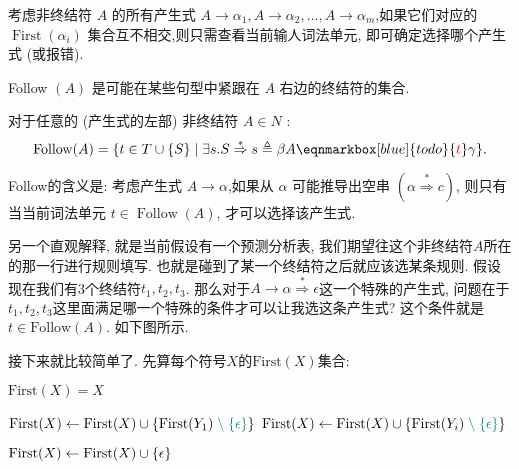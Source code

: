 \documentclass{ctexart}
\newcommand\first{\text{First}}
\begin{document}
考虑非终结符 $A$ 的所有产生式 $A \rightarrow \alpha_1, A \rightarrow \alpha_2, \ldots, A \rightarrow \alpha_m$,如果它们对应的 $\operatorname{First}\left(\alpha_i\right)$ 集合互不相交,则只需查看当前输人词法单元, 即可确定选择哪个产生式 (或报错). 

Follow $(A)$ 是可能在某些句型中紧跟在 $A$ 右边的终结符的集合. 

\begin{definition}[Follow($A$)集合]
    对于任意的 (产生式的左部) 非终结符 $A \in N$ :
$$
\operatorname{Follow}(A)=\{t \in T \cup\{S\} \mid \exists s . S \stackrel{*}{\Rightarrow} s \triangleq \beta A \eqnmarkbox[blue]{todo}{\red{t}} \gamma\} .
$$
\end{definition}

Follow的含义是: 考虑产生式 $A \rightarrow \alpha$,如果从 $\alpha$ 可能推导出空串 $(\alpha \stackrel{*}{\Rightarrow} c)$,
则只有当当前词法单元 $t \in \operatorname{Follow}(A)$, 才可以选择该产生式.

另一个直观解释, 就是当前假设有一个预测分析表, 我们期望往这个非终结符$A$所在的那一行进行规则填写. 也就是碰到了某一个终结符之后就应该选某条规则. 假设现在我们有3个终结符$t_1, t_2, t_3$. 那么对于$A \rightarrow \alpha \stackrel*\Rightarrow \epsilon$这一个特殊的产生式, 问题在于$t_1, t_2, t_3$这里面满足哪一个特殊的条件才可以让我选这条产生式? 这个条件就是$t\in\text{Follow}(A)$. 如下图所示. 


接下来就比较简单了. 先算每个符号$X$的$\text{First}(X)$集合: 

\begin{algorithm}[H]
    \begin{algorithmic}[1]
          
          \State $\first(X) = X$
        \EndIf


         
          \State $\first(X) \gets \first(X) \cup \set{\first(Y_{1}) \;\teal{\setminus\; \set{\epsilon}}}$
                \State $\first(X) \gets \first(X) \cup \set{\first(Y_{i}) \;\teal{\setminus\; \set{\epsilon}}}$
              \EndIf
          \EndFor

           
            \State $\first(X) \gets \first(X) \cup \set{\epsilon}$
          \EndIf
        \EndFor
      \EndProcedure
    \end{algorithmic}
    \end{algorithm}
    
\end{document}
